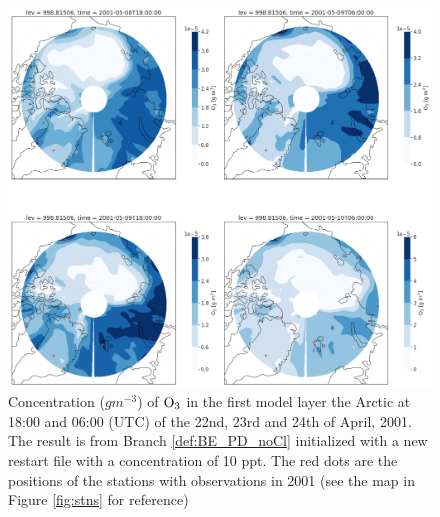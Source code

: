 \begin{figure}[h]
    \centering
    \includegraphics[width=\linewidth]{Chapter6_Results/images/Polar_StationComp_2001/O3/polarO3_step4.png}
    \caption{Concentration ($g m^{-3}$) of $\mathrm{O_3}$ in the first model layer the Arctic at 18:00 and 06:00 (UTC) of the  22nd, 23rd and 24th of April, 2001. The result is from Branch \ref{def:BE_PD_noCl} initialized with a new restart file with a  concentration of 10 ppt. The red dots are the positions of the stations with observations in 2001 (see the map in Figure \ref{fig:stns} for reference)}
    \label{fig:polarO3_step4}
\end{figure}